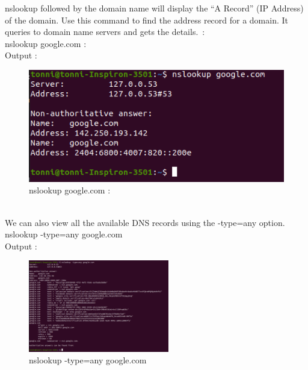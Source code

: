 \documentclass[11pt]{article}
\begin{document}
nslookup followed by the domain name will display the “A Record” (IP Address) of the domain. Use this command to find the address record for a domain. It queries to domain name servers and gets the details. :\\[6pt]
  nslookup google.com :\\[12pt]   
        Output : 
  \begin{figure}[!h]
\centering
\includegraphics[width=\textwidth]{ns_1.png}
\caption{nslookup google.com :}
\end{figure}
\\[12pt]
We can also view all the available DNS records using the -type=any option. \\[6pt]
  nslookup -type=any google.com\\[12pt]   
        Output : 
  \begin{figure}[!h]
\centering
\includegraphics[width=\textwidth,height=4cm,keepaspectratio]{ns_2.png}
\caption{nslookup -type=any google.com}
\end{figure}
\end{document}
